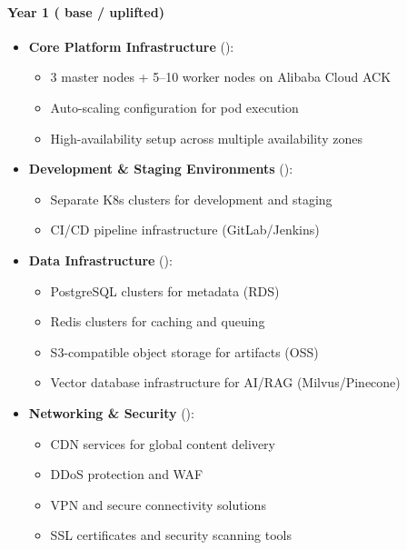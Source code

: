 \paragraph{Year 1 ( base /  uplifted)}

\begin{itemize}
    \item \textbf{Core Platform Infrastructure} ():
    \begin{itemize}
        \item 3 master nodes + 5--10 worker nodes on Alibaba Cloud ACK
        \item Auto-scaling configuration for pod execution
        \item High-availability setup across multiple availability zones
    \end{itemize}
    
    \item \textbf{Development \& Staging Environments} ():
    \begin{itemize}
        \item Separate K8s clusters for development and staging
        \item CI/CD pipeline infrastructure (GitLab/Jenkins)
    \end{itemize}
    
    \item \textbf{Data Infrastructure} ():
    \begin{itemize}
        \item PostgreSQL clusters for metadata (RDS)
        \item Redis clusters for caching and queuing
        \item S3-compatible object storage for artifacts (OSS)
        \item Vector database infrastructure for AI/RAG (Milvus/Pinecone)
    \end{itemize}
    
    \item \textbf{Networking \& Security} ():
    \begin{itemize}
        \item CDN services for global content delivery
        \item DDoS protection and WAF
        \item VPN and secure connectivity solutions
        \item SSL certificates and security scanning tools
    \end{itemize}
    

\end{itemize}
